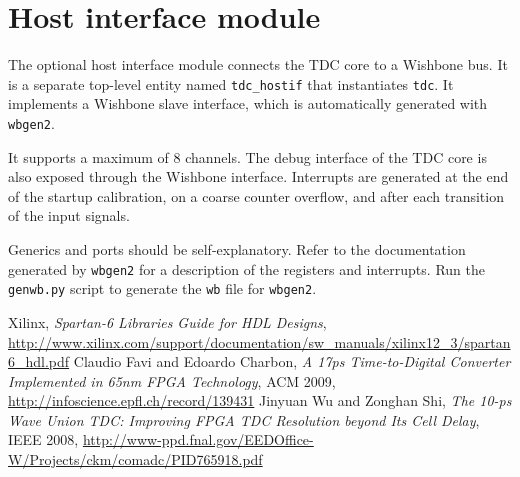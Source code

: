\documentclass[a4paper,11pt]{article}
\begin{document}
\section{Host interface module}
The optional host interface module connects the TDC core to a Wishbone bus. It is a separate top-level entity named \verb!tdc_hostif! that instantiates \verb!tdc!. It implements a Wishbone slave interface, which is automatically generated with \verb!wbgen2!.

It supports a maximum of 8 channels. The debug interface of the TDC core is also exposed through the Wishbone interface. Interrupts are generated at the end of the startup calibration, on a coarse counter overflow, and after each transition of the input signals.

Generics and ports should be self-explanatory. Refer to the documentation generated by \verb!wbgen2! for a description of the registers and interrupts. Run the \verb!genwb.py! script to generate the \verb!wb! file for \verb!wbgen2!.

\begin{thebibliography}{99}
 Xilinx, \textsl{Spartan-6 Libraries Guide for HDL Designs}, \url{http://www.xilinx.com/support/documentation/sw_manuals/xilinx12_3/spartan6_hdl.pdf}
 Claudio Favi and Edoardo Charbon, \textsl{A 17ps Time-to-Digital Converter Implemented in 65nm FPGA Technology}, ACM 2009, \url{http://infoscience.epfl.ch/record/139431}
 Jinyuan Wu and Zonghan Shi, \textsl{The 10-ps Wave Union TDC: Improving FPGA TDC Resolution beyond Its Cell Delay}, IEEE 2008, \url{http://www-ppd.fnal.gov/EEDOffice-W/Projects/ckm/comadc/PID765918.pdf}
\end{thebibliography}
\end{document}
